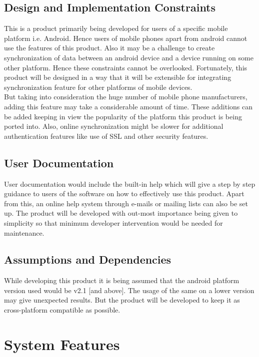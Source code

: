 \subsection{Design and Implementation Constraints}
\hspace*{0.82cm}This is a product primarily being developed for users of a specific mobile platform i.e.
Android. Hence users of mobile phones apart from android cannot use the features of this product.
Also it may be a challenge to create synchronization of data between an android device and a device
running on some other platform. Hence these constraints cannot be overlooked. Fortunately, this
product will be designed in a way that it will be extensible for integrating synchronization feature for
other platforms of mobile devices.\\[0.5cm]
\hspace*{0.82cm}But taking into consideration the huge number of mobile phone manufacturers, adding this
feature may take a considerable amount of time. These additions can be added keeping in view the
popularity of the platform this product is being ported into. Also, online synchronization might be
slower for additional authentication features like use of SSL and other security features.

\subsection{User Documentation}
\hspace*{0.82cm}User documentation would include the built-in help which will give a step by step guidance to
users of the software on how to effectively use this product. Apart from this, an online help system
through e-mails or mailing lists can also be set up. The product will be developed with out-most
importance being given to simplicity so that minimum developer intervention would be needed for
maintenance.

\subsection{Assumptions and Dependencies}
\hspace*{0.82cm}While developing this product it is being assumed that the android platform version used would
be v2.1 [and above]. The usage of the same on a lower version may give unexpected results. But the
product will be developed to keep it as cross-platform compatible as possible.

\section{System Features}
